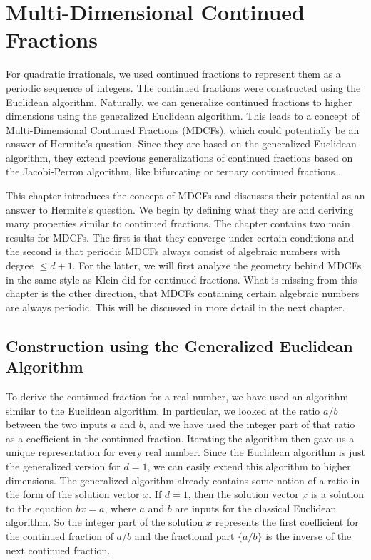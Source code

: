 \chapter{Multi-Dimensional Continued Fractions}
\label{ch:mdcf}

For quadratic irrationals, we used continued fractions to represent them as a
periodic sequence of integers.
The continued fractions were constructed using the Euclidean algorithm.
Naturally, we can generalize continued fractions to higher dimensions using the
generalized Euclidean algorithm.
This leads to a concept of Multi-Dimensional Continued Fractions (MDCFs), which could
potentially be an answer of Hermite's question.
Since they are based on the generalized Euclidean algorithm,
they extend previous generalizations of continued fractions based on the
Jacobi-Perron algorithm, like bifurcating or ternary continued fractions \cite{Gupta00}.

This chapter introduces the concept of MDCFs and discusses their potential as
an answer to Hermite's question.
We begin by defining what they are and deriving many properties similar to
continued fractions.
The chapter contains two main results for MDCFs.
The first is that they converge under certain conditions
and the second is that periodic MDCFs always consist of algebraic numbers with degree $≤ d+1$.
For the latter, we will first analyze the geometry behind MDCFs in the same
style as Klein did for continued fractions.
What is missing from this chapter is the other direction,
that MDCFs containing certain algebraic numbers are always periodic.
This will be discussed in more detail in the next chapter.

\section{Construction using the Generalized Euclidean Algorithm}

To derive the continued fraction for a real number, we have used an algorithm
similar to the Euclidean algorithm.
In particular, we looked at the ratio $a/b$ between the two inputs $a$ and $b$,
and we have used the integer part of that ratio as a coefficient in the
continued fraction.
Iterating the algorithm then gave us a unique representation for
every real number.
Since the Euclidean algorithm is just the generalized version for $d = 1$,
we can easily extend this algorithm to higher dimensions.
The generalized algorithm already contains some notion of a ratio in the form
of the solution vector $x$.
If $d = 1$, then the solution vector $x$ is a solution to the equation $bx = a$,
where $a$ and $b$ are inputs for the classical Euclidean algorithm.
So the integer part of the solution $x$ represents the first coefficient for
the continued fraction of $a/b$ and the fractional part $\{a/b\}$ is the
inverse of the next continued fraction.

